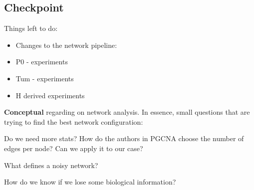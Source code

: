 \subsection{Checkpoint}


Things left to do:
\begin{itemize}
    \item Changes to the network pipeline:
    \item P0 - experiments
    \item Tum - experiments
    \item H derived experiments
\end{itemize}
\vspace{1cm}
\textbf{Conceptual} regarding on network analysis. In essence, small questions that are trying to find the best network configuration:
\begin{todolist}
    \item Do we need more stats? How do the authors in PGCNA choose the number of edges per node? Can we apply it to our case?
    \item What defines a noisy network?
    \item How do we know if we lose some biological information?
\end{todolist}